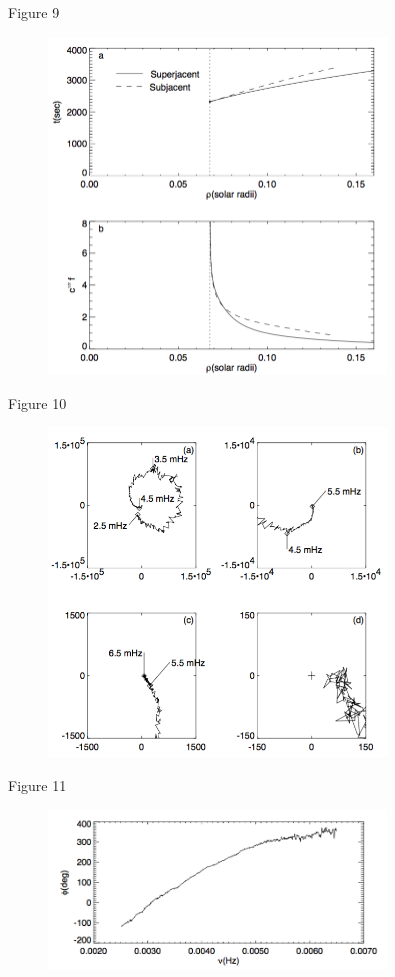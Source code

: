 \documentclass{beamer}
\begin{document}
\begin{frame}{Figure 9}
    \begin{figure}
        \includegraphics[width=0.8\textwidth]{fig_9.png}
    \end{figure}
\end{frame}

\begin{frame}{Figure 10}
    \begin{figure}
        \includegraphics[width=0.8\textwidth]{fig_10.png}
    \end{figure}
\end{frame}

\begin{frame}{Figure 11}
    \begin{figure}
        \includegraphics[width=0.8\textwidth]{fig_11.png}
    \end{figure}
\end{frame}
\end{document}
